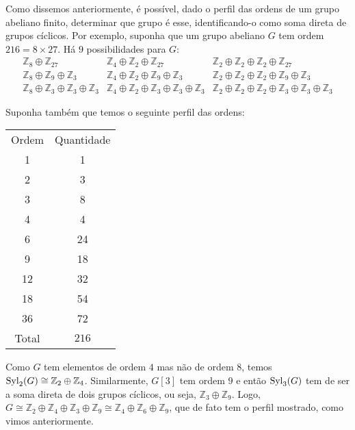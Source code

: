     	\par\vspace{0.3cm} Como dissemos anteriormente, é possível, dado o perfil das ordens de um grupo 
    	abeliano finito, determinar que grupo é esse, identificando-o como soma direta de grupos cíclicos. 
    	Por exemplo, suponha que um grupo abeliano $G$ tem ordem $216=8\times 27$. Há $9$ possibilidades para $G$:
    	\begin{equation*}
    		\begin{array}{lll}
    			\mathbb{Z}_8\oplus\mathbb{Z}_{27} & \mathbb{Z}_4\oplus\mathbb{Z}_2\oplus\mathbb{Z}_{27} &
    			\mathbb{Z}_2\oplus\mathbb{Z}_2\oplus\mathbb{Z}_2\oplus\mathbb{Z}_{27} \\
    			\mathbb{Z}_8\oplus\mathbb{Z}_9\oplus\mathbb{Z}_3 &
    			\mathbb{Z}_4\oplus\mathbb{Z}_2\oplus\mathbb{Z}_9\oplus\mathbb{Z}_3 &
    			\mathbb{Z}_2\oplus\mathbb{Z}_2\oplus\mathbb{Z}_2\oplus\mathbb{Z}_9\oplus\mathbb{Z}_3 \\
    			\mathbb{Z}_8\oplus\mathbb{Z}_3\oplus\mathbb{Z}_3\oplus\mathbb{Z}_3 &
    			\mathbb{Z}_4\oplus\mathbb{Z}_2\oplus\mathbb{Z}_3\oplus\mathbb{Z}_3\oplus\mathbb{Z}_3 &
    			\mathbb{Z}_2\oplus\mathbb{Z}_2\oplus\mathbb{Z}_2\oplus\mathbb{Z}_3\oplus\mathbb{Z}_3
    			\oplus\mathbb{Z}_3	
    		\end{array}
    	\end{equation*}
    	\par\vspace{0.3cm} Suponha também que temos o seguinte perfil das ordens:
    	\begin{center}
    		\begin{tabular}{|c|c|}
    			\cline{1-2}
    			Ordem & Quantidade  \\
    			\cline{1-2}
    			1 & 1  \\
    			\cline{1-2}
    			2 & 3 \\
    			\cline{1-2}
    			3 & 8 \\
    			\cline{1-2}
    			4 & 4 \\
    			\cline{1-2}
    			6 & 24 \\
    			\cline{1-2}
    			9 & 18 \\
    			\cline{1-2}
    			12 & 32  \\
    			\cline{1-2}
    			18 & 54 \\
    			\cline{1-2}
    			36 & 72  \\
    			\cline{1-2}
    			Total & $216$ \\
    			\cline{1-2}
    		\end{tabular}
    	\end{center}
    	\par\vspace{0.3cm} Como $G$ tem elementos de ordem $4$ mas não de ordem $8$, temos 
    	$\operatorname{Syl}_2(G)\cong \mathbb{Z}_2\oplus\mathbb{Z}_4$. Similarmente, $G[3]$ tem ordem $9$ e então 
    	$\operatorname{Syl}_3(G)$ tem de ser a soma direta de dois grupos cíclicos, ou seja, $\mathbb{Z}_3\oplus\mathbb{Z}_9$.
    	Logo, $G \cong \mathbb{Z}_2\oplus\mathbb{Z}_4\oplus\mathbb{Z}_3\oplus\mathbb{Z}_9
    	\cong \mathbb{Z}_4\oplus\mathbb{Z}_6\oplus\mathbb{Z}_9$, que de fato tem o perfil mostrado, 
    	como vimos anteriormente.
